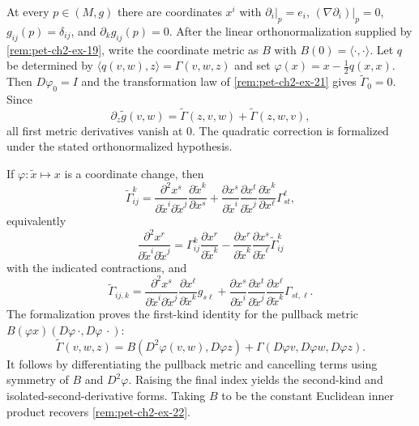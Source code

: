 \begin{remark}
  \label{rem:pet-ch2-ex-20}


  At every $p\in(M,g)$ there are coordinates
  $x^i$ with $\partial_i|_p=e_i$,
  $(\nabla\partial_i)|_p=0$, $g_{ij}(p)=\delta_{ij}$, and
  $\partial_kg_{ij}(p)=0$.
  \sketch
  After the linear orthonormalization supplied by
  \cref{rem:pet-ch2-ex-19}, write the coordinate metric as $B$ with
  $B(0)=\langle\cdot,\cdot\rangle$. Let $q$ be determined by
  $\langle q(v,w),z\rangle=\Gamma(v,w,z)$ and set
  $\varphi(x)=x-\tfrac12q(x,x)$. Then $D\varphi_0=I$ and the transformation
  law of \cref{rem:pet-ch2-ex-21} gives $\widetilde\Gamma_0=0$. Since
  \[
    \partial_z\widetilde g(v,w)
      =\widetilde\Gamma(z,v,w)+\widetilde\Gamma(z,w,v),
  \]
  all first metric derivatives vanish at $0$. The quadratic correction is
  formalized under the stated orthonormalized hypothesis.
\end{remark}

\begin{remark}
  \label{rem:pet-ch2-ex-21}


  If $\varphi:\tilde x\mapsto x$ is a coordinate
  change, then
  \[
    \widetilde\Gamma^k_{ij}
      =\frac{\partial^2x^s}
              {\partial\tilde x^i\partial\tilde x^j}
         \frac{\partial\tilde x^k}{\partial x^s}
       +\frac{\partial x^s}{\partial\tilde x^i}
        \frac{\partial x^t}{\partial\tilde x^j}
        \frac{\partial\tilde x^k}{\partial x^\ell}
        \Gamma^\ell_{st},
  \]
  equivalently
  \[
    \frac{\partial^2x^r}
         {\partial\tilde x^i\partial\tilde x^j}
      =\Gamma^k_{ij}\frac{\partial x^r}{\partial\tilde x^k}
       -\frac{\partial x^r}{\partial\tilde x^k}
        \frac{\partial x^s}{\partial\tilde x^\ell}
        \widetilde\Gamma^k_{ij}
  \]
  with the indicated contractions, and
  \[
    \widetilde\Gamma_{ij,k}
      =\frac{\partial^2x^s}
              {\partial\tilde x^i\partial\tilde x^j}
         \frac{\partial x^\ell}{\partial\tilde x^k}g_{s\ell}
       +\frac{\partial x^s}{\partial\tilde x^i}
        \frac{\partial x^t}{\partial\tilde x^j}
        \frac{\partial x^\ell}{\partial\tilde x^k}\Gamma_{st,\ell}.
  \]
  \sketch
  The formalization proves the first-kind identity for the pullback metric
  $B(\varphi x)(D\varphi\,\cdot,D\varphi\,\cdot)$:
  \[
    \widetilde\Gamma(v,w,z)
      =B(D^2\varphi(v,w),D\varphi z)
       +\Gamma(D\varphi v,D\varphi w,D\varphi z).
  \]
  It follows by differentiating the pullback metric and cancelling terms using
  symmetry of $B$ and $D^2\varphi$. Raising the final index yields the
  second-kind and isolated-second-derivative forms. Taking $B$ to be the
  constant Euclidean inner product recovers \cref{rem:pet-ch2-ex-22}.
\end{remark}


